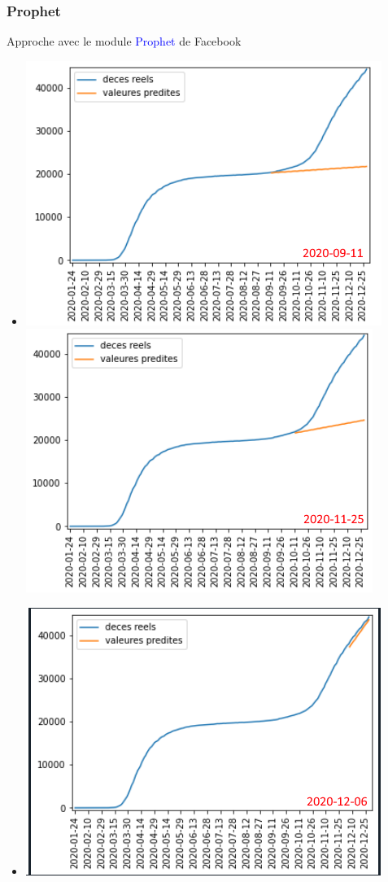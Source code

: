 \documentclass{beamer}[aspectratio = 43]
\begin{document}
\begin{frame}
	\frametitle{Prophet}
	Approche avec le module \textcolor{blue}{Prophet} de Facebook
	\begin{itemize}
		\centering
		\item[]\includegraphics[scale=0.4]{prophet_bpt}
		\includegraphics[scale=0.4]{prophet_mpt}
		\item[]\includegraphics[scale=0.4]{prophet_ppt}
	\end{itemize}
\end{frame}
\end{document}
